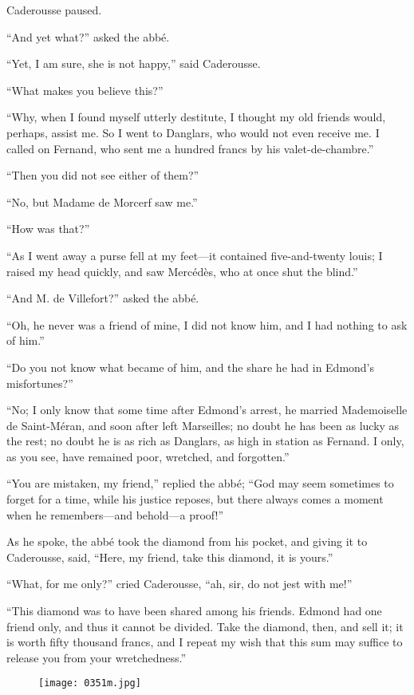 Caderousse paused.

“And yet what?” asked the abbé.

“Yet, I am sure, she is not happy,” said Caderousse.

“What makes you believe this?”

“Why, when I found myself utterly destitute, I thought my old friends
would, perhaps, assist me. So I went to Danglars, who would not even
receive me. I called on Fernand, who sent me a hundred francs by his
valet-de-chambre.”

“Then you did not see either of them?”

“No, but Madame de Morcerf saw me.”

“How was that?”

“As I went away a purse fell at my feet—it contained five-and-twenty
louis; I raised my head quickly, and saw Mercédès, who at once shut the
blind.”

“And M. de Villefort?” asked the abbé.

“Oh, he never was a friend of mine, I did not know him, and I had
nothing to ask of him.”

“Do you not know what became of him, and the share he had in Edmond’s
misfortunes?”

“No; I only know that some time after Edmond’s arrest, he married
Mademoiselle de Saint-Méran, and soon after left Marseilles; no doubt
he has been as lucky as the rest; no doubt he is as rich as Danglars,
as high in station as Fernand. I only, as you see, have remained poor,
wretched, and forgotten.”

“You are mistaken, my friend,” replied the abbé; “God may seem
sometimes to forget for a time, while his justice reposes, but there
always comes a moment when he remembers—and behold—a proof!”

As he spoke, the abbé took the diamond from his pocket, and giving it
to Caderousse, said, “Here, my friend, take this diamond, it is yours.”

“What, for me only?” cried Caderousse, “ah, sir, do not jest with me!”

“This diamond was to have been shared among his friends. Edmond had one
friend only, and thus it cannot be divided. Take the diamond, then, and
sell it; it is worth fifty thousand francs, and I repeat my wish that
this sum may suffice to release you from your wretchedness.”

\begin{figure}[ht]
\texttt{[image: 0351m.jpg]}
\end{figure}

